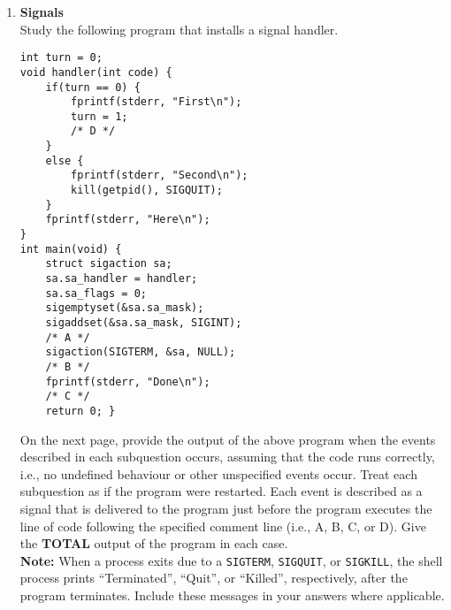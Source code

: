 \documentclass[11pt]{article}
\begin{document}
\begin{enumerate}
	\newpage
	\item \textbf{Signals}\\
		Study the following program that installs a signal handler.
		\begin{Verbatim}
int turn = 0;
void handler(int code) {
	if(turn == 0) {
		fprintf(stderr, "First\n");
		turn = 1;
		/* D */
	}
	else {
		fprintf(stderr, "Second\n");
		kill(getpid(), SIGQUIT);
	}
	fprintf(stderr, "Here\n");
}
int main(void) {
	struct sigaction sa;
	sa.sa_handler = handler;
	sa.sa_flags = 0;
	sigemptyset(&sa.sa_mask);
	sigaddset(&sa.sa_mask, SIGINT);
	/* A */
	sigaction(SIGTERM, &sa, NULL);
	/* B */
	fprintf(stderr, "Done\n");
	/* C */
	return 0; }
		\end{Verbatim}
		On the next page, provide the output of the above program when the events described in each subquestion occurs, assuming that the code runs correctly, i.e., no undefined behaviour or other unspecified events occur. Treat each subquestion as if the program were restarted. Each event is described as a signal that is delivered to the program just before the program executes the line of code following the specified comment line (i.e., A, B, C, or D). Give the \textbf{TOTAL} output of the program in each case.\\
		\textbf{Note:} When a process exits due to a \Verb|SIGTERM|, \Verb|SIGQUIT|, or \Verb|SIGKILL|, the shell process prints “Terminated”, “Quit”, or “Killed”, respectively, after the program terminates. Include these messages in your answers where applicable.


\end{enumerate}
\end{document}
